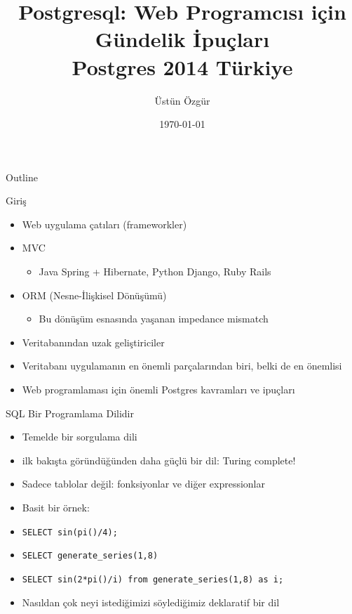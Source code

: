 \documentclass[presentation]{beamer}
\author{Üstün Özgür}
\date{\today}
\title{Postgresql: Web Programcısı için Gündelik İpuçları \\ Postgres 2014 Türkiye}
\begin{document}
\maketitle
\begin{frame}{Outline}
\tableofcontents
\end{frame}


\begin{frame}[label=sec-1]{Giriş}
\begin{itemize}
\item Web uygulama çatıları (frameworkler)

\item MVC
\begin{itemize}
\item Java Spring + Hibernate, Python Django, Ruby Rails
\end{itemize}
\item ORM (Nesne-İlişkisel Dönüşümü)
\begin{itemize}
\item Bu dönüşüm esnasında yaşanan impedance mismatch
\end{itemize}
\item Veritabanından uzak geliştiriciler
\item Veritabanı uygulamanın en önemli parçalarından biri, belki de en önemlisi
\item Web programlaması için önemli Postgres kavramları ve ipuçları
\end{itemize}
\end{frame}

\begin{frame}[fragile,label=sec-2]{SQL Bir Programlama Dilidir}
 \begin{itemize}
\item Temelde bir sorgulama dili
\item ilk bakışta göründüğünden daha güçlü bir dil: Turing complete!
\item Sadece tablolar değil: fonksiyonlar ve diğer expressionlar
\item Basit bir örnek:
\item \texttt{SELECT sin(pi()/4);}
\item \texttt{SELECT generate\_series(1,8)}
\item \texttt{SELECT sin(2*pi()/i) from generate\_series(1,8) as i;}
\item Nasıldan çok neyi istediğimizi söylediğimiz deklaratif bir dil
\end{itemize}
\end{frame}
\end{document}
